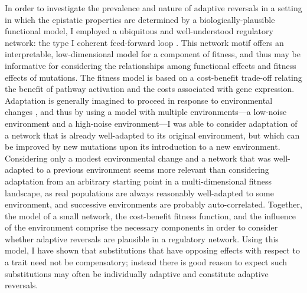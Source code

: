 \documentclass[dvips,12pt,twoside,titlepage]{article}
\begin{document}
In order to investigate the prevalence and nature of adaptive reversals in a setting in which the epistatic properties are determined by a biologically-plausible functional model, I employed a ubiquitous and well-understood regulatory network: the type I coherent feed-forward loop \cite{ShenOrr:2002jo,Mangan:2003vl,Alon:2007ca}. 
This network motif offers an interpretable, low-dimensional model for a component of fitness, and thus may be informative for considering the relationships among functional effects and fitness effects of mutations.
The fitness model is based on a cost-benefit trade-off relating the benefit of pathway activation and the costs associated with gene expression. 
Adaptation is generally imagined to proceed in response to environmental changes \cite{Takahata:1975ug,Gillespie:1993ww}, 
and thus by using a model with multiple environments---a low-noise environment and a high-noise environment---I was able to consider adaptation of a network that is already well-adapted to its original environment, but which can be improved by new mutations upon its introduction to a new environment. 
Considering only a modest environmental change and a network that was well-adapted to a previous environment seems more relevant than considering adaptation from an arbitrary starting point in a multi-dimensional fitness landscape, as real populations are always reasonably well-adapted to some environment, and successive environments are probably auto-correlated.
Together, the model of a small network, the cost-benefit fitness function, and the influence of the environment comprise the necessary components in order to consider whether adaptive reversals are plausible in a regulatory network.
Using this model, I have shown that substitutions that have opposing effects with respect to a trait need not be compensatory; instead there is good reason to expect such substitutions may often be individually adaptive and constitute adaptive reversals. 
\end{document}
